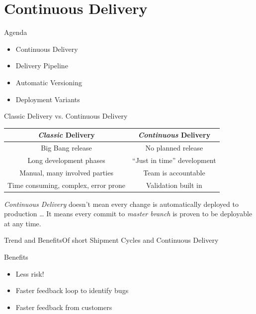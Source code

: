 


\part{Continuous Delivery}

\begin{frame}{Agenda}
\begin{itemize}
	\item Continuous Delivery
	\item Delivery Pipeline
	\item Automatic Versioning
	\item Deployment Variants
\end{itemize}
\end{frame}

\begin{frame}{Classic Delivery vs. Continuous Delivery}
\begin{table}[]
\centering

\label{my-label}
\begin{tabular}{@{}cc@{}}
\toprule
\rowcolor[HTML]{EFEFEF} 
\emph{Classic} Delivery  & \emph{Continuous} Delivery\\ \midrule
Big Bang release & No planned release \\
Long development phases  & ``Just in time'' development \\
Manual, many involved parties & Team is accountable\\
Time consuming, complex, error prone & Validation built in \\
\bottomrule
\end{tabular}
\end{table}
\vfill
\emph{Continuous Delivery} doesn't mean every change is automatically deployed to production \ldots 
It means every commit to \emph{master branch} is proven to be deployable at any time.
\end{frame}

\begin{frame}{Trend and Benefits}{Of short Shipment Cycles and Continuous Delivery}
  \centerline{}

  \begin{block}{Benefits}
  \begin{itemize}
    \item Less risk!
    \item Faster feedback loop to identify bugs
    \item Faster feedback from customers
  \end{itemize}
  \end{block}
\end{frame}

